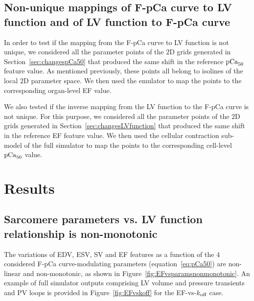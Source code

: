 %
%
%
\subsection{Non-unique mappings of F-pCa curve to LV function and of LV function to F-pCa curve}
In order to test if the mapping from the F-pCa curve to LV function is not unique, we considered all the parameter points of the $2$D grids generated in Section~\ref{sec:changespCa50} that produced the same shift in the reference $\textrm{pCa}_{50}$ feature value. As mentioned previously, these points all belong to isolines of the local $2$D parameter space. We then used the emulator to map the points to the corresponding organ-level EF value.

\vspace{0.2cm}
We also tested if the inverse mapping from the LV function to the F-pCa curve is not unique. For this purpose, we considered all the parameter points of the $2$D grids generated in Section~\ref{sec:changesLVfunction} that produced the same shift in the reference EF feature value. We then used the cellular contraction sub-model of the full simulator to map the points to the corresponding cell-level $\textrm{pCa}_{50}$ value.


%
%
%
\section{Results}


%
%
%
\subsection{Sarcomere parameters vs. LV function relationship is non-monotonic}
The variations of EDV, ESV, SV and EF features as a function of the $4$ considered F-pCa curve-modulating parameters (equation~\eqref{eq:pCa50}) are non-linear and non-monotonic, as shown in Figure~\ref{fig:EFvsparamsnonmonotonic}. An example of full simulator outputs comprising LV volume and pressure transients and PV loops is provided in Figure~\ref{fig:EFvskoff} for the EF-vs-$k_{\textrm{off}}$ case.


